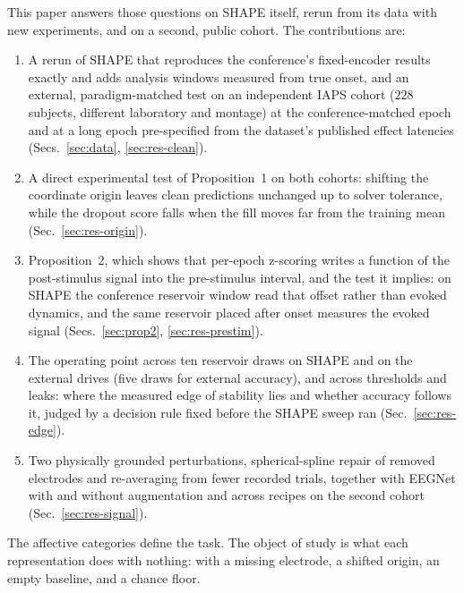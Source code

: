 \documentclass[journal]{IEEEtran}
\begin{document}
This paper answers those questions on SHAPE itself, rerun from its data with new experiments, and on a second, public cohort. The contributions are:
\begin{enumerate}
    \item A rerun of SHAPE that reproduces the conference's fixed-encoder results exactly and adds analysis windows measured from true onset, and an external, paradigm-matched test on an independent IAPS cohort ($228$ subjects, different laboratory and montage) at the conference-matched epoch and at a long epoch pre-specified from the dataset's published effect latencies (Secs.~\ref{sec:data}, \ref{sec:res-clean}).
    \item A direct experimental test of Proposition~1 on both cohorts: shifting the coordinate origin leaves clean predictions unchanged up to solver tolerance, while the dropout score falls when the fill moves far from the training mean (Sec.~\ref{sec:res-origin}).
    \item Proposition~2, which shows that per-epoch z-scoring writes a function of the post-stimulus signal into the pre-stimulus interval, and the test it implies: on SHAPE the conference reservoir window read that offset rather than evoked dynamics, and the same reservoir placed after onset measures the evoked signal (Secs.~\ref{sec:prop2}, \ref{sec:res-prestim}).
    \item The operating point across ten reservoir draws on SHAPE and on the external drives (five draws for external accuracy), and across thresholds and leaks: where the measured edge of stability lies and whether accuracy follows it, judged by a decision rule fixed before the SHAPE sweep ran (Sec.~\ref{sec:res-edge}).
    \item Two physically grounded perturbations, spherical-spline repair of removed electrodes and re-averaging from fewer recorded trials, together with EEGNet with and without augmentation and across recipes on the second cohort (Sec.~\ref{sec:res-signal}).
\end{enumerate}
The affective categories define the task. The object of study is what each representation does with nothing: with a missing electrode, a shifted origin, an empty baseline, and a chance floor.
\end{document}
